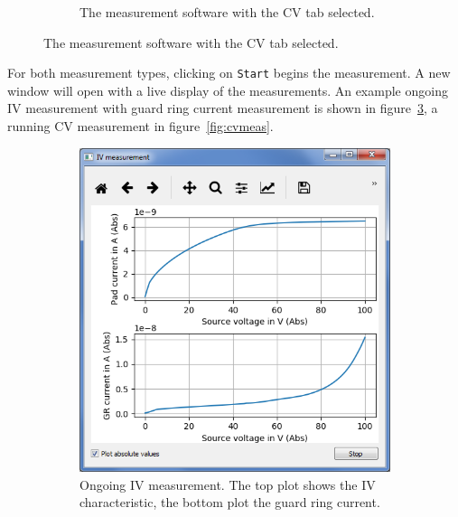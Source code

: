 \documentclass[a4paper]{article}
\begin{document}
\begin{figure}[hbtp]
\begin{subfigure}[t]{0.475\textwidth}
\caption[Software with the CV Tab]{The measurement software with the CV tab selected.}
\label{fig:softwareopencv}
\end{subfigure}
\end{figure}

For both measurement types, clicking on {\tt Start} begins the measurement.
A new window will open with a live display of the measurements.
An example ongoing IV measurement with guard ring current measurement is shown in figure~\ref{fig:ivmeas}, a running CV measurement in figure~\ref{fig:cvmeas}.\\

\begin{figure}[hbtp]
\centering
\begin{subfigure}[t]{0.475\textwidth}
\centering\captionsetup{width=.8\linewidth}%
\includegraphics[width=\linewidth]{pictures/ivmeas.png}
\caption[Running IV Measurement]{Ongoing IV measurement. The top plot shows the IV characteristic, the bottom plot the guard ring current.}
\label{fig:ivmeas}
\end{subfigure}
\begin{subfigure}[t]{0.475\textwidth}
\centering\captionsetup{width=.8\linewidth}%

\end{subfigure}
\end{figure}
\end{document}
